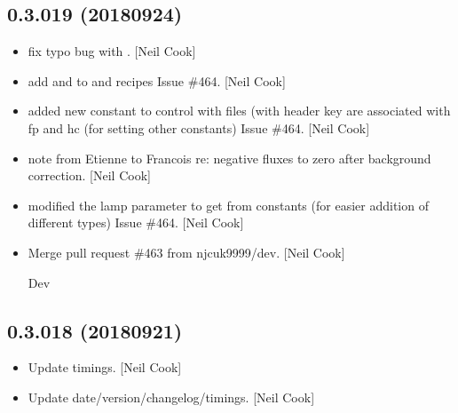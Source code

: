 \documentclass[a4paper,10pt,english]{report}
\begin{document}
\subsection{0.3.019 (2018\sphinxhyphen{}09\sphinxhyphen{}24)}
\label{\detokenize{misc/changelog:id331}}\begin{itemize}
\item {} 
 \sphinxhyphen{} fix typo bug with
. {[}Neil Cook{]}

\item {} 
 \sphinxhyphen{} add  and  to  and
 recipes \sphinxhyphen{} Issue \#464. {[}Neil Cook{]}

\item {} 
 \sphinxhyphen{} added new constant to control with files
(with header key  are associated with fp and hc (for
setting other constants) \sphinxhyphen{} Issue \#464. {[}Neil Cook{]}

\item {} 
 \sphinxhyphen{} note from Etienne to Francois re: negative
fluxes to zero after background correction. {[}Neil Cook{]}

\item {} 
 \sphinxhyphen{} modified the lamp parameter to get from
constants (for easier addition of different types) \sphinxhyphen{} Issue \#464. {[}Neil
Cook{]}

\item {} 
Merge pull request \#463 from njcuk9999/dev. {[}Neil Cook{]}

Dev

\end{itemize}


\subsection{0.3.018 (2018\sphinxhyphen{}09\sphinxhyphen{}21)}
\label{\detokenize{misc/changelog:id332}}\begin{itemize}
\item {} 
Update timings. {[}Neil Cook{]}

\item {} 
Update date/version/changelog/timings. {[}Neil Cook{]}

\end{itemize}
\end{document}
